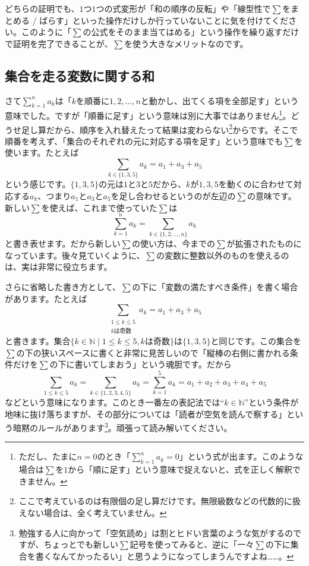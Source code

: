 どちらの証明でも、$1$つ$1$つの式変形が「和の順序の反転」や「線型性で$\sum$をまとめる / ばらす」といった操作だけしか行っていないことに気を付けてください。このように「$\sum$の公式をそのまま当てはめる」という操作を繰り返すだけで証明を完了できることが、$\sum$を使う大きなメリットなのです。



\subsection{集合を走る変数に関する和}

さて$\sum_{k =1}^n a_k$は「$k$を順番に$1,2,\ldots,n$と動かし、出てくる項を全部足す」という意味でした。ですが「順番に足す」という意味は別に大事ではありません\footnote{ただし、たまに$n = 0$のとき「$\sum_{k = 1}^n a_k = 0$」という式が出ます。このような場合は$\sum$を$1$から「順に足す」という意味で捉えないと、式を正しく解釈できません。}。どうせ足し算だから、順序を入れ替えたって結果は変わらない\footnote{ここで考えているのは有限個の足し算だけです。無限級数などの代数的に扱えない場合は、全く考えていません。}からです。そこで順番を考えず、「集合のそれぞれの元に対応する項を足す」という意味でも$\sum$を使います。たとえば
\[
\sum_{k\in\{1,3,5\}} a_k = a_1 + a_3 + a_5
\]
という感じです。$\{1,3,5\}$の元は$1$と$3$と$5$だから、$k$が$1,3,5$を動くのに合わせて対応する$a_k$、つまり$a_1$と$a_3$と$a_5$を足し合わせるというのが左辺の$\sum$の意味です。新しい$\sum$を使えば、これまで使っていた$\sum$は
\[
\sum_{k = 1}^n a_k = \sum_{k\in\{1,2,\ldots,n\}} a_k
\]
と書き表せます。だから新しい$\sum$の使い方は、今までの$\sum$が拡張されたものになっています。後々見ていくように、$\sum$の変数に整数以外のものを使えるのは、実は非常に役立ちます。

さらに省略した書き方として、$\sum$の下に「変数の満たすべき条件」を書く場合があります。たとえば
\[
\sum_{\substack{1\leq k\leq 5\\ \text{$k$は奇数}}} a_k = a_1 + a_3 + a_5
\]
と書きます。集合$\{k\in\mathbb{N}\mid 1\leq k\leq 5, \text{$k$は奇数}\}$は$\{1,3,5\}$と同じです。この集合を$\sum$の下の狭いスペースに書くと非常に見苦しいので「縦棒の右側に書かれる条件だけを$\sum$の下に書いてしまおう」という魂胆です。だから
\[
\sum_{1\leq k\leq 5} a_k = \sum_{k\in\{1,2,3,4,5\}} a_k = \sum_{k = 1}^5 a_k = a_1 + a_2 + a_3 + a_4 + a_5
\]
などという意味になります。このとき一番左の表記法では``$k\in\mathbb{N}$''という条件が地味に抜け落ちますが、その部分については「読者が空気を読んで察する」という暗黙のルールがあります\footnote{勉強する人に向かって「空気読め」は割とヒドい言葉のような気がするのですが、ちょっとでも新しい$\sum$記号を使ってみると、逆に「一々$\sum$の下に集合を書くなんてかったるい」と思うようになってしまうんですよね……。}。頑張って読み解いてください。


